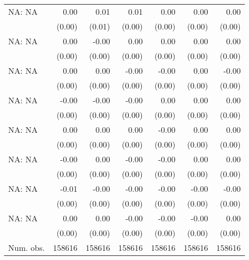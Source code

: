 \begin{table}
\begin{center}
\begin{tiny}
\begin{tabular}{l@{} D{.}{.}{6.4}@{} D{.}{.}{6.4}@{} D{.}{.}{6.4}@{} D{.}{.}{6.4}@{} D{.}{.}{6.5}@{} D{.}{.}{6.3}@{}}
NA: NA                                & 0.00      & 0.01      & 0.01      & 0.00      & 0.00       & 0.00     \\
                                      & (0.00)    & (0.01)    & (0.00)    & (0.00)    & (0.00)     & (0.00)   \\
NA: NA                                & 0.00      & -0.00     & 0.00      & 0.00      & 0.00       & 0.00     \\
                                      & (0.00)    & (0.00)    & (0.00)    & (0.00)    & (0.00)     & (0.00)   \\
NA: NA                                & 0.00      & 0.00      & -0.00     & -0.00     & 0.00       & -0.00    \\
                                      & (0.00)    & (0.00)    & (0.00)    & (0.00)    & (0.00)     & (0.00)   \\
NA: NA                                & -0.00     & -0.00     & -0.00     & 0.00      & 0.00       & 0.00     \\
                                      & (0.00)    & (0.00)    & (0.00)    & (0.00)    & (0.00)     & (0.00)   \\
NA: NA                                & 0.00      & 0.00      & 0.00      & -0.00     & 0.00       & 0.00     \\
                                      & (0.00)    & (0.00)    & (0.00)    & (0.00)    & (0.00)     & (0.00)   \\
NA: NA                                & -0.00     & 0.00      & -0.00     & -0.00     & 0.00       & 0.00     \\
                                      & (0.00)    & (0.00)    & (0.00)    & (0.00)    & (0.00)     & (0.00)   \\
NA: NA                                & -0.01     & -0.00     & -0.00     & -0.00     & -0.00      & -0.00    \\
                                      & (0.00)    & (0.00)    & (0.00)    & (0.00)    & (0.00)     & (0.00)   \\
NA: NA                                & 0.00      & 0.00      & -0.00     & -0.00     & -0.00      & 0.00     \\
                                      & (0.00)    & (0.00)    & (0.00)    & (0.00)    & (0.00)     & (0.00)   \\
\hline
Num. obs.                             & 158616    & 158616    & 158616    & 158616    & 158616     & 158616   \\

\end{tabular}
\end{tiny}
\end{center}
\end{table}
